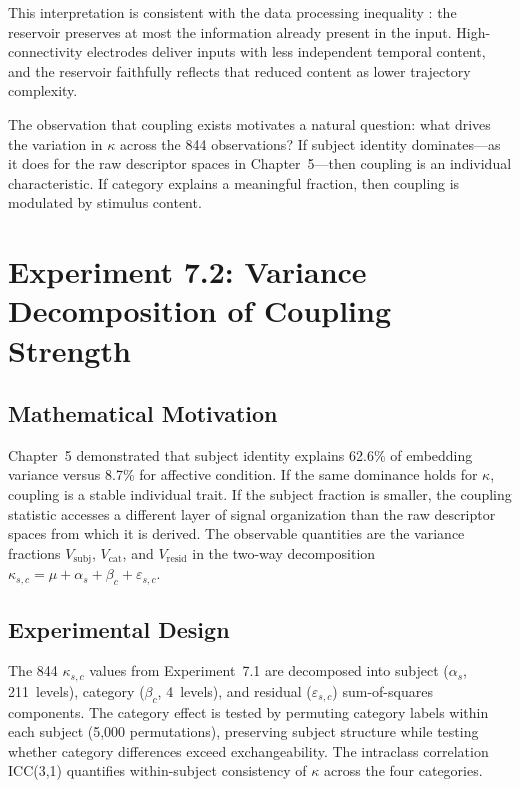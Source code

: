 This interpretation is consistent with the data processing inequality \cite{cover_elements_2006}: the reservoir preserves at most the information already present in the input. High-connectivity electrodes deliver inputs with less independent temporal content, and the reservoir faithfully reflects that reduced content as lower trajectory complexity.

The observation that coupling exists motivates a natural question: what drives the variation in $\kappa$ across the 844 observations? If subject identity dominates---as it does for the raw descriptor spaces in Chapter~5---then coupling is an individual characteristic. If category explains a meaningful fraction, then coupling is modulated by stimulus content.


\section{Experiment 7.2: Variance Decomposition of Coupling Strength}
\label{sec:exp7_variance}

\subsection{Mathematical Motivation}

Chapter~5 demonstrated that subject identity explains 62.6\% of embedding variance versus 8.7\% for affective condition. If the same dominance holds for $\kappa$, coupling is a stable individual trait. If the subject fraction is smaller, the coupling statistic accesses a different layer of signal organization than the raw descriptor spaces from which it is derived. The observable quantities are the variance fractions $V_{\text{subj}}$, $V_{\text{cat}}$, and $V_{\text{resid}}$ in the two-way decomposition $\kappa_{s,c} = \mu + \alpha_s + \beta_c + \varepsilon_{s,c}$.

\subsection{Experimental Design}

The 844 $\kappa_{s,c}$ values from Experiment~7.1 are decomposed into subject ($\alpha_s$, 211~levels), category ($\beta_c$, 4~levels), and residual ($\varepsilon_{s,c}$) sum-of-squares components. The category effect is tested by permuting category labels within each subject (5,000 permutations), preserving subject structure while testing whether category differences exceed exchangeability. The intraclass correlation ICC(3,1) \cite{shrout_intraclass_1979} quantifies within-subject consistency of $\kappa$ across the four categories.

